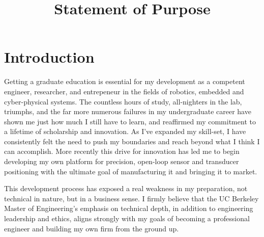 \documentclass[journal, draftcls]{IEEEtran}
\begin{document}
%
\title{Statement of Purpose}
\author{
}
\maketitle
\section{Introduction}

Getting a graduate education is essential for my development as a competent engineer, researcher, and entrepeneur in the fields of robotics, embedded and cyber-physical systems. The countless hours of study, all-nighters in the lab, triumphs, and the far more numerous failures in my undergraduate career have shown me just how much I still have to learn, and reaffirmed my commitment to a lifetime of scholarship and innovation. As I've expanded my skill-set, I have consistently felt the need to push my  boundaries and reach beyond what I think I can accomplish. More recently this drive for innovation has led me to begin developing my own platform for precision, open-loop sensor and transducer positioning with the ultimate goal of manufacturing it and bringing it to market. 

This development process has exposed a real weakness in my preparation, not technical in nature, but in a business sense. I firmly believe that the UC Berkeley Master of Engineering's  emphasis on technical depth, in addition to engineering leadership and ethics, aligns strongly with my goals of becoming a professional engineer and building my own firm from the ground up. 
\end{document}

